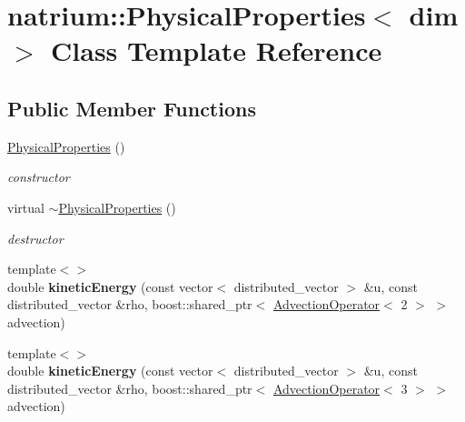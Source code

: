 \hypertarget{classnatrium_1_1PhysicalProperties}{
\section{natrium::PhysicalProperties$<$ dim $>$ Class Template Reference}
\label{classnatrium_1_1PhysicalProperties}
}
\subsection*{Public Member Functions}
\begin{DoxyCompactItemize}
\item 
\hypertarget{classnatrium_1_1PhysicalProperties_a5047491de09441e2aae00f6ba838f99e}{
\hyperlink{classnatrium_1_1PhysicalProperties_a5047491de09441e2aae00f6ba838f99e}{PhysicalProperties} ()}
\label{classnatrium_1_1PhysicalProperties_a5047491de09441e2aae00f6ba838f99e}

\begin{DoxyCompactList}\small\item\em constructor \item\end{DoxyCompactList}\item 
\hypertarget{classnatrium_1_1PhysicalProperties_a1089bbb66f56e8c31cdb2908d5b08757}{
virtual \hyperlink{classnatrium_1_1PhysicalProperties_a1089bbb66f56e8c31cdb2908d5b08757}{$\sim$PhysicalProperties} ()}
\label{classnatrium_1_1PhysicalProperties_a1089bbb66f56e8c31cdb2908d5b08757}

\begin{DoxyCompactList}\small\item\em destructor \item\end{DoxyCompactList}\item 
\hypertarget{classnatrium_1_1PhysicalProperties_a7d649be1cf509d35b5771926dc54f622}{
{\footnotesize template$<$$>$ }\\double {\bfseries kineticEnergy} (const vector$<$ distributed\_\-vector $>$ \&u, const distributed\_\-vector \&rho, boost::shared\_\-ptr$<$ \hyperlink{classnatrium_1_1AdvectionOperator}{AdvectionOperator}$<$ 2 $>$ $>$ advection)}
\label{classnatrium_1_1PhysicalProperties_a7d649be1cf509d35b5771926dc54f622}

\item 
\hypertarget{classnatrium_1_1PhysicalProperties_aea561f3e9b80571b1cdecb66425365cf}{
{\footnotesize template$<$$>$ }\\double {\bfseries kineticEnergy} (const vector$<$ distributed\_\-vector $>$ \&u, const distributed\_\-vector \&rho, boost::shared\_\-ptr$<$ \hyperlink{classnatrium_1_1AdvectionOperator}{AdvectionOperator}$<$ 3 $>$ $>$ advection)}
\label{classnatrium_1_1PhysicalProperties_aea561f3e9b80571b1cdecb66425365cf}

\end{DoxyCompactItemize}

